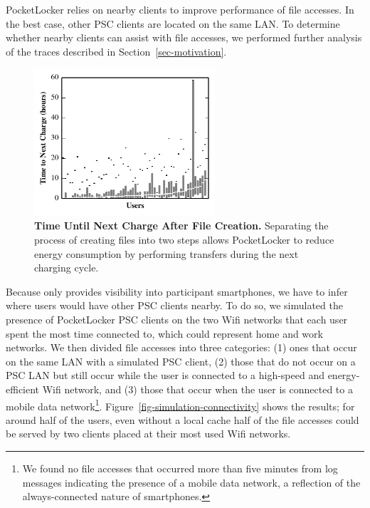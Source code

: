 PocketLocker relies on nearby clients to improve performance of file
accesses. In the best case, other PSC clients are located on the same LAN. To
determine whether nearby clients can assist with file accesses, we performed further
analysis of the traces described in Section~\ref{sec-motivation}.

\begin{figure}

  \vspace*{-0.3in}

  \includegraphics[width=0.6\textwidth]{./figures/pocketlocker/BatteryLengthDistributionGraph.pdf}
  
  \vspace*{-0.1in}

  \caption{\small \textbf{Time Until Next Charge After File Creation.}
    Separating the process of creating files into two steps allows
  PocketLocker to reduce energy consumption by performing transfers during
the next charging cycle.}
  
  \vspace*{-0.2in}

  \label{fig-simulation-battery}

\end{figure}

Because \PhoneLab{} only provides visibility into participant smartphones, we
have to infer where users would have other PSC clients nearby. To do so, we
simulated the presence of PocketLocker PSC clients on the two Wifi networks
that each user spent the most time connected to, which could represent home
and work networks. We then divided file accesses into three categories: (1)
ones that occur on the same LAN with a simulated PSC client, (2) those that
do not occur on a PSC LAN but still occur while the user is connected to a
high-speed and energy-efficient Wifi network, and (3) those that occur when
the user is connected to a mobile data network\footnote{We found no file
  accesses that occurred more than five minutes from log messages indicating
  the presence of a mobile data network, a reflection of the always-connected
nature of smartphones.}. Figure~\ref{fig-simulation-connectivity} shows the
results; for around half of the users, even without a local cache half of the
file accesses could be served by two clients placed at their most
used Wifi networks. 


